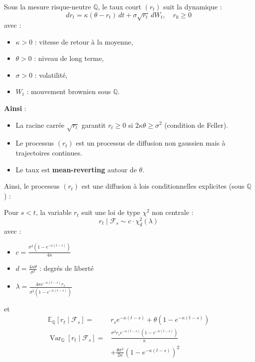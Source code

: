 \begin{f}
	
Sous la mesure risque-neutre \(\mathbb{Q}\), le taux court \((r_t)\) suit la dynamique :
\[
dr_t = \kappa(\theta - r_t)\,dt + \sigma \sqrt{r_t}\, dW_t, \quad r_0 \geq 0
\]
avec :
\begin{itemize}[nosep]
	\item \(\kappa > 0\) : vitesse de retour à la moyenne,
	\item \(\theta > 0\) : niveau de long terme,
	\item \(\sigma > 0\) : volatilité,
	\item \(W_t\) : mouvement brownien sous \(\mathbb{Q}\).
\end{itemize}

\textbf{Ainsi} :
\begin{itemize}
	\item La racine carrée \(\sqrt{r_t}\) garantit \(r_t \geq 0\) si \(2\kappa\theta \geq \sigma^2\) (condition de Feller).
	\item Le processus \((r_t)\) est un processus de diffusion non gaussien mais à trajectoires continues.
	\item Le taux est \textbf{mean-reverting} autour de \(\theta\).
\end{itemize}

Ainsi, le processus \((r_t)\) est une diffusion à lois conditionnelles explicites (sous \(\mathbb{Q}\)) :

Pour \(s < t\), la variable \(r_t\) suit une loi de type \(\chi^2\) non centrale :
\[
r_t \mid \mathcal{F}_s \sim c \cdot \chi^2_{d}(\lambda)
\]
avec :
\begin{itemize}[nosep]
	\item \(\displaystyle c = \frac{\sigma^2 (1 - e^{-\kappa (t - s)})}{4\kappa}\)
	\item \(\displaystyle d = \frac{4\kappa\theta}{\sigma^2}\) : degrés de liberté
	\item \(\displaystyle \lambda = \frac{4\kappa e^{-\kappa (t - s)} r_s}{\sigma^2 (1 - e^{-\kappa (t - s)})}\)
\end{itemize}

et
\[
\begin{aligned}
	\mathbb{E}_\mathbb{Q}[r_t \mid \mathcal{F}_s] =& r_s e^{-\kappa(t-s)} + \theta (1 - e^{-\kappa(t-s)}) \\
	\operatorname{Var}_\mathbb{Q}[r_t \mid \mathcal{F}_s] =& \frac{\sigma^2 r_s e^{-\kappa(t-s)} (1 - e^{-\kappa(t-s)})}{\kappa} \\
			&+ \frac{\theta \sigma^2}{2\kappa} (1 - e^{-\kappa(t-s)})^2
\end{aligned}
\]

\end{f}
